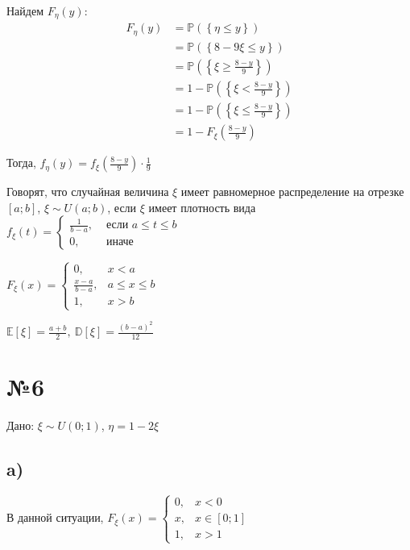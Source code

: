 \documentclass[a4paper, 10pt]{article}
\newcommand{\prob}[1]{\mathbb{P}\left(\left\{#1\right\}\right)}
\newcommand{\matwait}[1]{\mathbb{E}\left[#1\right]}
\newcommand{\dispersia}[1]{\mathbb{D}\left[#1\right]}
\begin{document}
Найдем $F_{\eta}(y):$
\begin{equation*}
    \begin{aligned}
        F_{\eta}(y)&=\prob{\eta\leqslant y}\\
        &=\prob{8-9\xi\leqslant y}\\
        &=\prob{\xi\geqslant \frac{8-y}{9}}\\
        &=1-\prob{\xi<\frac{8-y}{9}}\\
        &=1-\prob{\xi\leqslant\frac{8-y}{9}}\\
        &=1-F_{\xi}\left(\frac{8-y}{9}\right)
    \end{aligned}
\end{equation*}

Тогда, $f_{\eta}(y)=f_{\xi}\left(\displaystyle\frac{8-y}{9}\right)\cdot\displaystyle\frac{1}{9}$

 Говорят, что случайная величина $\xi$ имеет равномерное распределение на отрезке $[a;b]$, $\xi\sim U(a;b)$, если $\xi$ имеет плотность вида $f_{\xi}(t)=\begin{cases}
    \frac{1}{b-a},&\text{ если }a\leqslant t\leqslant b\\
    0,&\text{ иначе}
\end{cases}$

$F_{\xi}(x)=\begin{cases}
    0,&x<a\\
    \frac{x-a}{b-a},&a\leqslant x\leqslant b\\
    1,&x>b
\end{cases}$

$\matwait{\xi}=\displaystyle\frac{a+b}{2},\ \dispersia{\xi}=\displaystyle\frac{(b-a)^2}{12}$

\section*{№6}
Дано: $\xi\sim U(0;1)$, $\eta=1-2\xi$
\subsection*{a)}
В данной ситуации, $F_{\xi}(x)=\begin{cases}
    0,&x<0\\
    x,&x\in[0;1]\\
    1,&x>1
\end{cases}$
\end{document}
